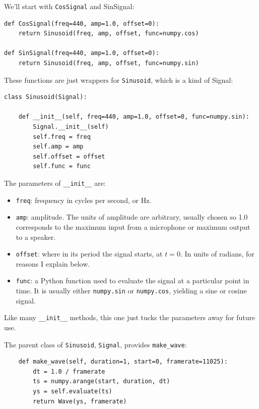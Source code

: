 \documentclass[12pt]{book}
\begin{document}
We'll start with {\tt CosSignal} and {SinSignal}:

\begin{verbatim}
def CosSignal(freq=440, amp=1.0, offset=0):
    return Sinusoid(freq, amp, offset, func=numpy.cos)

def SinSignal(freq=440, amp=1.0, offset=0):
    return Sinusoid(freq, amp, offset, func=numpy.sin)
\end{verbatim}

These functions are just wrappers for {\tt Sinusoid}, which
is a kind of Signal:

\begin{verbatim}
class Sinusoid(Signal):
    
    def __init__(self, freq=440, amp=1.0, offset=0, func=numpy.sin):
        Signal.__init__(self)
        self.freq = freq
        self.amp = amp
        self.offset = offset
        self.func = func
\end{verbatim}

The parameters of \verb"__init__" are:

\begin{itemize}

\item {\tt freq}: frequency in cycles per second, or Hz.

\item {\tt amp}: amplitude.  The units of amplitude are arbitrary,
usually chosen so 1.0 corresponds to the maximum input from a
microphone or maximum output to a speaker.

\item {\tt offset}: where in its period the signal starts, at $t=0$.
In units of radians, for reasons I explain below.

\item {\tt func}: a Python function used
to evaluate the signal at a particular point in time.  It is
usually either {\tt numpy.sin} or {\tt numpy.cos}, yielding a sine or
cosine signal.

\end{itemize}

Like many \verb"__init__" methods, this one just tucks the
parameters away for future use.

The parent class of {\tt Sinusoid}, {\tt Signal}, provides \verb"make_wave":

\begin{verbatim}
    def make_wave(self, duration=1, start=0, framerate=11025):
        dt = 1.0 / framerate
        ts = numpy.arange(start, duration, dt)
        ys = self.evaluate(ts)
        return Wave(ys, framerate)
\end{verbatim}
\end{document}
